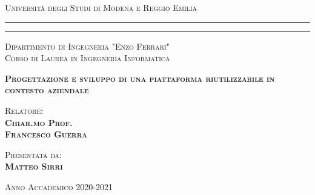 \textwidth=450pt\oddsidemargin=0pt

\begin{titlepage}
    \begin{center}
        {{\Large{\textsc{Universit\`a degli Studi di Modena e Reggio Emilia}}}} \rule[0.1cm]{15.8cm}{0.1mm}
        \rule[0.5cm]{15.8cm}{0.6mm}
        {\small{\textsc{Dipartimento di Ingegneria "Enzo Ferrari"\\
                    Corso di Laurea in Ingegneria Informatica}}}
    \end{center}
    \vspace{40mm}
    \begin{center}
        \LARGE{\textsc{\textbf{Progettazione e sviluppo di una piattaforma riutilizzabile in contesto aziendale}}}
    \end{center}
    \vspace{40mm}
    \par
    \noindent
    \begin{minipage}[t]{0.47\textwidth}
        {\large{\textsc{Relatore:}}\\
        {\bf \textsc{Chiar.mo Prof.\\
            Francesco Guerra}}}
    \end{minipage}
    \hfill
    \begin{minipage}[t]{0.47\textwidth}\raggedleft
        {\large{\textsc{Presentata da:}}\\
        {\bf \textsc{Matteo Sirri}}}
    \end{minipage}
    \vspace*{\fill}
    \begin{center}
        {\large{\textsc{Anno Accademico 2020-2021}}}
    \end{center}
\end{titlepage}
